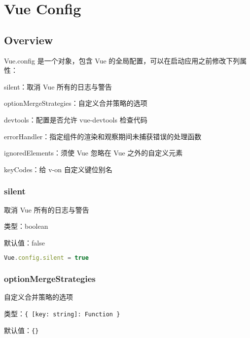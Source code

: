 \part{Vue Config}


\chapter{Overview}


Vue.config 是一个对象，包含 Vue 的全局配置，可以在启动应用之前修改下列属性：


\begin{compactitem}
\item silent：取消 Vue 所有的日志与警告
\item optionMergeStrategies：自定义合并策略的选项
\item devtools：配置是否允许 vue-devtools 检查代码
\item errorHandler：指定组件的渲染和观察期间未捕获错误的处理函数
\item ignoredElements：须使 Vue 忽略在 Vue 之外的自定义元素
\item keyCodes：给 v-on 自定义键位别名
\end{compactitem}


\section{silent}

取消 Vue 所有的日志与警告

\begin{compactitem}
\item 类型：boolean
\item 默认值：false
\end{compactitem}




\begin{lstlisting}[language=JavaScript]
Vue.config.silent = true
\end{lstlisting}


\section{optionMergeStrategies}

自定义合并策略的选项

\begin{compactitem}
\item 类型：\texttt{\{ [key: string]: Function \}}
\item 默认值：\texttt{\{\}}
\end{compactitem}

